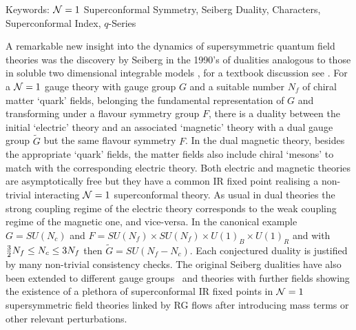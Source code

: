 {{{{Keywords:
${\cal N}=1$ Superconformal Symmetry, Seiberg Duality, Characters, Superconformal Index, 
$q$-Series

\narrower}}

\vfill
{}
}

\eject}


\noindent
{}
\noindent
A remarkable new insight into the dynamics of supersymmetric quantum field
theories was the discovery by Seiberg in the 1990's of dualities 
analogous to those in soluble two dimensional integrable models \Sei, 
for a textbook discussion see \Tern. For a ${\cal N}=1$ gauge theory with
gauge group $G$ and a suitable number $N_f$ of chiral matter `quark' fields, 
belonging the fundamental representation of $G$ and transforming under a flavour
symmetry group $F$, there is a duality between the initial 
`electric' theory and an associated `magnetic' theory with a dual gauge group
$\tilde G$ but the same flavour symmetry $F$. In the dual magnetic theory,
besides the appropriate `quark' fields, the matter fields also include chiral
`mesons' to match with the corresponding electric theory.
Both electric and magnetic theories are asymptotically free 
but they have a common IR fixed point realising a non-trivial interacting 
${\cal N}=1$ superconformal theory. As usual in dual theories the strong coupling regime 
of the electric theory corresponds to the weak coupling regime of the magnetic one, 
and vice-versa. In the
canonical example $G=SU(N_c)$ and $F=SU(N_f)\times SU(N_f) \times U(1)_B \times
U(1)_R$ and with ${3\over 2} N_f \le N_c \le 3N_f$ then $\tilde G = SU(N_f -N_c)$.
Each conjectured duality is justified by many non-trivial consistency checks.
The original Seiberg dualities have also been extended to different
gauge groups \intrilo\ and theories with further fields  showing 
the existence of a plethora of superconformal IR fixed points in ${\cal N}=1$ 
supersymmetric field theories linked by RG flows after introducing mass terms or 
other relevant perturbations.
 
